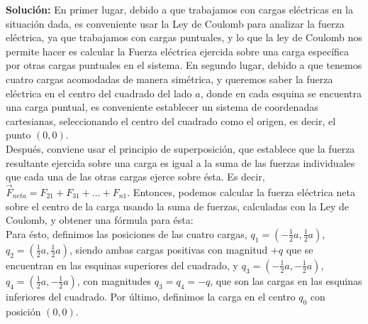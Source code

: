 \documentclass[12pt, letterpaper]{report}
\begin{document}
\textbf{Solución: } En primer lugar, debido a que trabajamos con cargas eléctricas en la situación dada, es conveniente usar la Ley de Coulomb para analizar la fuerza eléctrica, ya que 
trabajamos con cargas puntuales, y lo que la ley de Coulomb nos permite hacer es calcular la Fuerza eléctrica ejercida sobre una carga específica por otras cargas puntuales en el sistema. 
En segundo lugar, debido a que tenemos cuatro cargas acomodadas de manera simétrica, y queremos saber la fuerza eléctrica en el centro del cuadrado del lado $a$, donde en cada esquina se encuentra 
una carga puntual, es conveniente establecer un sistema de coordenadas cartesianas, seleccionando el centro del cuadrado como el origen, es decir, el punto $(0, 0)$.\\ 

Después, conviene usar el principio de superposición, que establece que la fuerza resultante ejercida sobre una carga es igual a la suma de las fuerzas individuales 
que cada una de las otras cargas ejerce sobre ésta. Es decir, $\vec{F}_{neta} = F_{21} + F_{31} + ... + F_{n1}$. 
Entonces, podemos calcular la fuerza eléctrica neta sobre el centro de la carga usando la suma de fuerzas, calculadas con la Ley de Coulomb, y obtener una fórmula para ésta: \\

Para ésto, definimos las posiciones de las cuatro cargas, $q_1 = (-\frac{1}{2}a, \frac{1}{2}a)$, $q_2 = (\frac{1}{2}a, \frac{1}{2}a)$, siendo ambas cargas positivas con magnitud $+q$ que se encuentran 
en las esquinas superiores del cuadrado, y 
$q_3 = (-\frac{1}{2}a, -\frac{1}{2}a)$, $q_4 = (\frac{1}{2}a, -\frac{1}{2}a)$, con magnitudes $q_3 = q_4 = -q$, que son las cargas en las esquinas inferiores del cuadrado. Por último, definimos la carga en el centro $q_0$ con posición $(0, 0)$.\\ 
\end{document}
